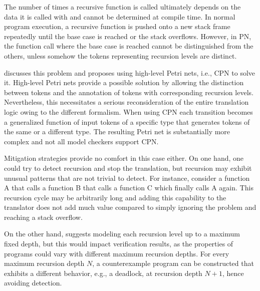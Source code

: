 The number of times a recursive function is called ultimately depends
on the data it is called with and cannot be determined at compile time.
In normal program execution,
a recursive function is pushed onto a new stack frame repeatedly
until the base case is reached or the stack overflows.
However, in \acrshort{PN}, the function call where the base case is reached
cannot be distinguished from the others,
unless somehow the tokens representing recursion levels are distinct.

\cite[Sec. 3.4.2]{meyer2020} discusses this problem
and proposes using high-level Petri nets, i.e., \acrfull{CPN} to solve it.
High-level Petri nets provide a possible solution by allowing the distinction
between tokens and the annotation of tokens with corresponding recursion levels.
Nevertheless, this necessitates a serious reconsideration of the entire translation logic
owing to the different formalism.
When using \acrshort{CPN} each transition becomes a generalized function of
input tokens of a specific type that generates tokens of the same or a different type.
The resulting Petri net is substantially more complex
and not all model checkers support \acrshort{CPN}.

Mitigation strategies provide no comfort in this case either.
On one hand, one could try to detect recursion and stop the translation,
but recursion may exhibit unusual patterns that are not trivial to detect.
For instance, consider a function A that calls a function B
that calls a function C which finally calls A again.
This recursion cycle may be arbitrarily long
and adding this capability to the translator
does not add much value compared to
simply ignoring the problem and reaching a stack overflow.

On the other hand, \cite{meyer2020} suggests
modeling each recursion level up to a maximum fixed depth,
but this would impact verification results,
as the properties of programs could vary with different maximum recursion depths.
For every maximum recursion depth $N$, a counterexample program can be constructed that exhibits
a different behavior, e.g., a deadlock, at recursion depth $N+1$, hence avoiding detection.